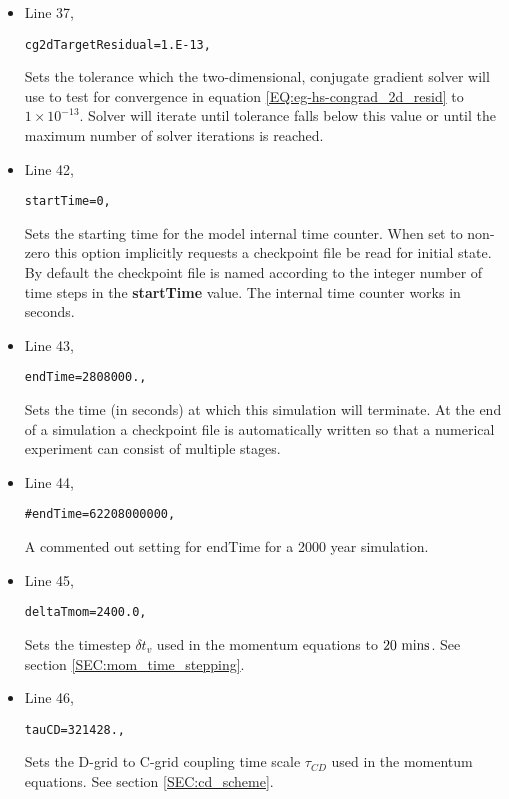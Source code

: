 \begin{itemize}
\item Line 37,
\begin{verbatim}
cg2dTargetResidual=1.E-13,
\end{verbatim}
Sets the tolerance which the two-dimensional, conjugate
gradient solver will use to test for convergence in equation 
\ref{EQ:eg-hs-congrad_2d_resid} to $1 \times 10^{-13}$.
Solver will iterate until 
tolerance falls below this value or until the maximum number of
solver iterations is reached.\\

\item Line 42,
\begin{verbatim}
startTime=0,
\end{verbatim}
Sets the starting time for the model internal time counter.
When set to non-zero this option implicitly requests a 
checkpoint file be read for initial state.
By default the checkpoint file is named according to
the integer number of time steps in the {\bf startTime} value.
The internal time counter works in seconds.

\item Line 43,
\begin{verbatim}
endTime=2808000.,
\end{verbatim}
Sets the time (in seconds) at which this simulation will terminate.
At the end of a simulation a checkpoint file is automatically
written so that a numerical experiment can consist of multiple
stages.

\item Line 44,
\begin{verbatim}
#endTime=62208000000,
\end{verbatim}
A commented out setting for endTime for a 2000 year simulation.

\item Line 45,
\begin{verbatim}
deltaTmom=2400.0,
\end{verbatim}
Sets the timestep $\delta t_{v}$ used in the momentum equations to
$20~{\rm mins}$.
See section \ref{SEC:mom_time_stepping}.


\item Line 46,
\begin{verbatim}
tauCD=321428.,
\end{verbatim}
Sets the D-grid to C-grid coupling time scale $\tau_{CD}$ used in the momentum equations.
See section \ref{SEC:cd_scheme}.


\end{itemize}
